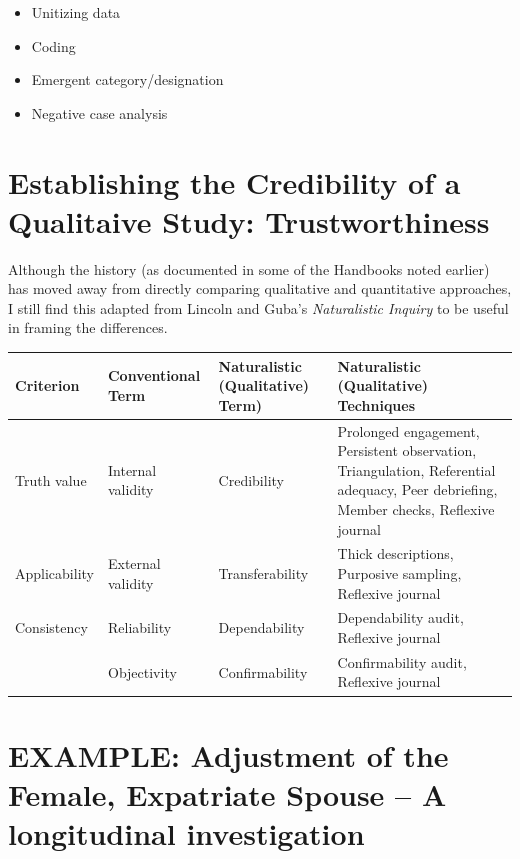 \documentclass[
  english,
]{book}
\providecommand{\tightlist}{%
  \setlength{\itemsep}{0pt}\setlength{\parskip}{0pt}}
\begin{document}
\begin{itemize}
\tightlist
\item
  Unitizing data
\item
  Coding
\item
  Emergent category/designation
\item
  Negative case analysis
\end{itemize}

\hypertarget{establishing-the-credibility-of-a-qualitaive-study-trustworthiness}{%
\section{Establishing the Credibility of a Qualitaive Study: Trustworthiness}\label{establishing-the-credibility-of-a-qualitaive-study-trustworthiness}}

Although the history (as documented in some of the Handbooks noted earlier) has moved away from directly comparing qualitative and quantitative approaches, I still find this adapted from Lincoln and Guba's \emph{Naturalistic Inquiry} \citeyearpar{lincoln_naturalistic_1985} to be useful in framing the differences.

\begin{longtable}[]{@{}
  >{\raggedright\arraybackslash}p{}
  >{\raggedright\arraybackslash}p{}
  >{\raggedright\arraybackslash}p{}
  >{\raggedright\arraybackslash}p{}@{}}
\toprule
Criterion & Conventional Term & Naturalistic (Qualitative) Term) & Naturalistic (Qualitative) Techniques \\
\midrule
\endhead
Truth value & Internal validity & Credibility & Prolonged engagement, Persistent observation, Triangulation, Referential adequacy, Peer debriefing, Member checks, Reflexive journal \\
Applicability & External validity & Transferability & Thick descriptions, Purposive sampling, Reflexive journal \\
Consistency & Reliability & Dependability & Dependability audit, Reflexive journal \\
& Objectivity & Confirmability & Confirmability audit, Reflexive journal \\
\bottomrule
\end{longtable}

\hypertarget{example-adjustment-of-the-female-expatriate-spouse-a-longitudinal-investigation-bikos_repeated_2007}{%
\section{\texorpdfstring{EXAMPLE: Adjustment of the Female, Expatriate Spouse -- A longitudinal investigation \citep{bikos_repeated_2007}}{EXAMPLE: Adjustment of the Female, Expatriate Spouse -- A longitudinal investigation {[}@bikos\_repeated\_2007{]}}}\label{example-adjustment-of-the-female-expatriate-spouse-a-longitudinal-investigation-bikos_repeated_2007}}
\end{document}
